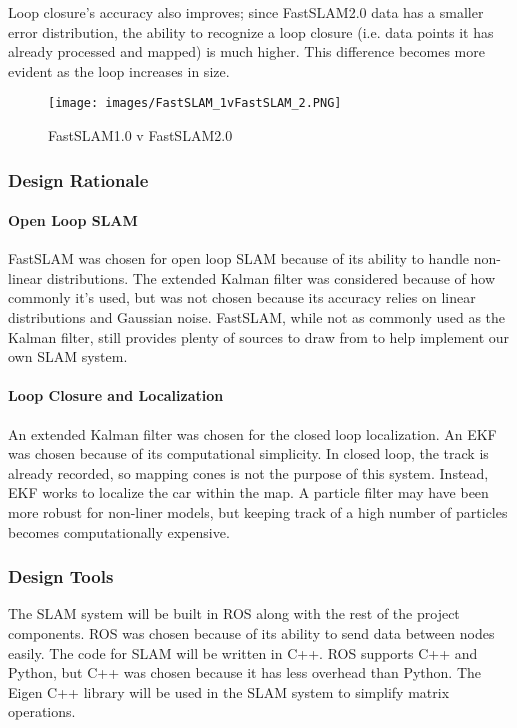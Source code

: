 \documentclass[10pt, onecolumn, draftclsnofoot, letterpaper,compsoc]{IEEEtran}
\begin{document}
Loop closure's accuracy also improves; since FastSLAM2.0 data has a smaller error distribution, the ability to recognize a loop closure (i.e. data points it has already processed and mapped) is much higher. This difference becomes more evident as the loop increases in size. 

\begin{figure}[H]
\centering
\label{fig:FastSLAM1.0vFastSLAM2.0}
\caption{FastSLAM1.0 v FastSLAM2.0}
\texttt{[image: images/FastSLAM\_1vFastSLAM\_2.PNG]}
\end{figure}


\subsubsection{Design Rationale} %
\paragraph{Open Loop SLAM}
FastSLAM was chosen for open loop SLAM because of its ability to handle non-linear distributions. The extended Kalman filter was considered because of how commonly it's used, but was not chosen because its accuracy relies on linear distributions and Gaussian noise. FastSLAM, while not as commonly used as the Kalman filter, still provides plenty of sources to draw from to help implement our own SLAM system.

\paragraph{Loop Closure and Localization}
An extended Kalman filter was chosen for the closed loop localization. An EKF was chosen because of its computational simplicity. In closed loop, the track is already recorded, so mapping cones is not the purpose of this system. Instead, EKF works to localize the car within the map. A particle filter may have been more robust for non-liner models, but keeping track of a high number of particles becomes computationally expensive.

\subsubsection{Design Tools} %
The SLAM system will be built in ROS along with the rest of the project components. ROS was chosen because of its ability to send data between nodes easily. The code for SLAM will be written in C++. ROS supports C++ and Python, but C++ was chosen because it has less overhead than Python. The Eigen C++ library will be used in the SLAM system to simplify matrix operations.
\end{document}
